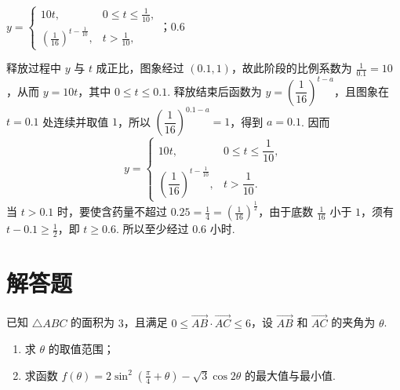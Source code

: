 \begin{answer}
\(y=\begin{cases}
10t,&0\leqslant t\leqslant \frac{1}{10},\\
\left(\frac{1}{16}\right)^{t-\frac{1}{10}},&t>\frac{1}{10},
\end{cases}\)；\(0.6\)
\end{answer}

\begin{solution}
释放过程中 \(y\) 与 \(t\) 成正比，图象经过 \((0.1,1)\)，故此阶段的比例系数为 \(\frac{1}{0.1}=10\)，从而 \(y=10t\)，其中 \(0\leqslant t\leqslant0.1\). 释放结束后函数为 \(y=\left(\dfrac1{16}\right)^{t-a}\)，且图象在 \(t=0.1\) 处连续并取值 \(1\)，所以 \(\left(\dfrac1{16}\right)^{0.1-a}=1\)，得到 \(a=0.1\). 因而
\[
y=\begin{cases}
10t,&0\leqslant t\leqslant\dfrac1{10},\\
\left(\dfrac1{16}\right)^{t-\frac1{10}},&t>\dfrac1{10}.
\end{cases}
\]
当 \(t>0.1\) 时，要使含药量不超过 \(0.25=\frac{1}{4}=(\frac{1}{16})^{\frac{1}{2}}\)，由于底数 \(\frac{1}{16}\) 小于 \(1\)，须有 \(t-0.1\geqslant\frac{1}{2}\)，即 \(t\geqslant0.6\). 所以至少经过 \(0.6\) 小时.
\end{solution}

\section{解答题}

\begin{problem}
已知 \(\triangle ABC\) 的面积为 \(3\)，且满足 \(0 \leqslant \overrightarrow{AB} \cdot \overrightarrow{AC} \leqslant 6\)，设 \(\overrightarrow{AB}\) 和 \(\overrightarrow{AC}\) 的夹角为 \(\theta\).

\begin{enumerate}
\item 求 \(\theta\) 的取值范围；
\item 求函数 \(f(\theta) = 2\sin^2\left(\frac{\pi}{4} + \theta\right) - \sqrt{3}\cos 2\theta\) 的最大值与最小值.
\end{enumerate}
\end{problem}

